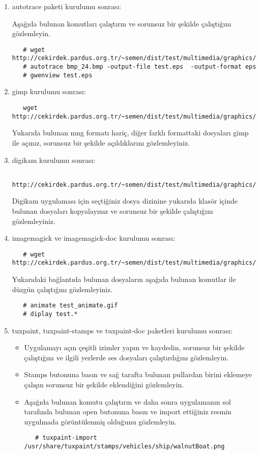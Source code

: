 \documentclass[a4paper,10pt]{article}
\begin{document}
\begin{enumerate}
\item autotrace paketi kurulumu sonrası:

Aşağıda bulunan komutları çalıştırın ve sorunsuz bir şekilde çalıştığını gözlemleyin.
  \begin{verbatim}
   # wget http://cekirdek.pardus.org.tr/~semen/dist/test/multimedia/graphics/bmp_24.bmp
   # autotrace bmp_24.bmp -output-file test.eps  -output-format eps
   # gwenview test.eps 
  \end{verbatim}

 \item gimp kurulumu sonrası:
  \begin{verbatim}
   wget http://cekirdek.pardus.org.tr/~semen/dist/test/multimedia/graphics/graphics.tar
  \end{verbatim}

 Yukarıda bulunan mng formatı hariç, diğer farklı formattaki dosyaları gimp ile açınız, sorunsuz bir şekilde açıldıklarını gözlemleyiniz.
\item digikam kurulumu sonrası:

  \begin{verbatim}
   http://cekirdek.pardus.org.tr/~semen/dist/test/multimedia/graphics/graphics.tar
  \end{verbatim}

 Digikam uygulaması için seçtiğiniz dosya dizinine yukarıda klasör içinde bulunan dosyaları kopyalayınız ve sorunsuz bir şekilde çalıştığını gözlemleyiniz.
\item imagemagick ve imagemagick-doc kurulumu sonrası:
  \begin{verbatim}
   # wget http://cekirdek.pardus.org.tr/~semen/dist/test/multimedia/graphics/graphics.tar
  \end{verbatim}

Yukarıdaki bağlantıda bulunan dosyaların aşağıda bulunan komutlar ile düzgün çalıştığını gözlemleyiniz.
  \begin{verbatim}
   # animate test_animate.gif
   # diplay test.*
  \end{verbatim}
\item tuxpaint, tuxpaint-stamps ve tuxpaint-doc paketleri kurulumu sonrası:
  \begin{itemize}
   \item  Uygulamayı açın çeşitli izimler yapın ve kaydedin, sorunsuz bir şekilde çalıştığını ve ilgili yerlerde ses dosyaları çalıştırdığını gözlemleyin.
   \item Stamps butonuna basın ve sağ tarafta bulunan pullardan birini eklemeye çalışın sorunsuz bir şekilde eklendiğini gözlemleyin.
   \item Aşağıda bulunan komutu çalıştırın ve daha sonra uygulamanın sol tarafında bulunan open butonuna basın ve import ettiğiniz resmin uygulmada görüntülenmiş olduğunu gözlemleyin.
\begin{verbatim}
   # tuxpaint-import /usr/share/tuxpaint/stamps/vehicles/ship/walnutBoat.png
\end{verbatim} 
\end{itemize}


\end{enumerate}
\end{document}
